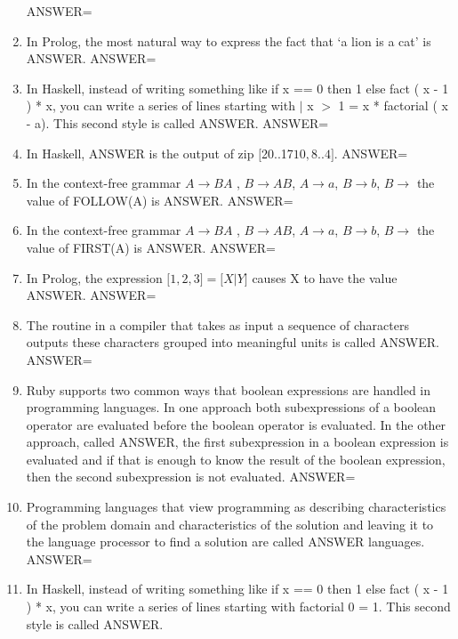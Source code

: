 \documentclass{exam}
\begin{document}
\begin{enumerate}
ANSWER=
\item In Prolog, the most natural way to express the fact that `a lion is a cat' is ANSWER.\newline
ANSWER=
\item In Haskell, instead of writing something like if x == 0 then 1 else fact ( x - 1 ) * x, you can write a series of lines starting with $|$ x $>$ 1 = x * factorial ( x - a).  This second style is called ANSWER.\newline
ANSWER=
\item In Haskell, ANSWER is the output of zip $\lbrack$20..17\rbrack$ $\lbrack$10,8..4\rbrack$.\newline
ANSWER=
\item In the context-free grammar $A \rightarrow B A$ , $B \rightarrow A B$, $A \rightarrow a$, $B \rightarrow b$, $B \rightarrow$  the value of FOLLOW(A) is ANSWER.\newline
ANSWER=
\item In the context-free grammar $A \rightarrow B A$ , $B \rightarrow A B$, $A \rightarrow a$, $B \rightarrow b$, $B \rightarrow$  the value of FIRST(A) is ANSWER.\newline
ANSWER=
\item In Prolog, the expression $\lbrack 1, 2, 3\rbrack = \lbrack X | Y\rbrack$ causes X to have the value ANSWER.\newline
ANSWER=
\item The routine in a compiler that takes as input a sequence of characters outputs these characters grouped into meaningful units is called ANSWER.\newline
ANSWER=
\item Ruby supports two common ways that boolean expressions are handled in programming languages.  In one approach both subexpressions of a boolean operator are evaluated before the boolean operator is evaluated.  In the other approach, called ANSWER, the first subexpression in a boolean expression is evaluated and if that is enough to know the result of the boolean expression, then the second subexpression is not evaluated.\newline
ANSWER=
\item Programming languages that view programming as describing characteristics of the problem domain and characteristics of the solution and leaving it to the language processor to find a solution are called ANSWER languages.\newline
ANSWER=
\item In Haskell, instead of writing something like if x == 0 then 1 else fact ( x - 1 ) * x, you can write a series of lines starting with factorial 0 = 1.  This second style is called ANSWER.\newline

\end{enumerate}
\end{document}
